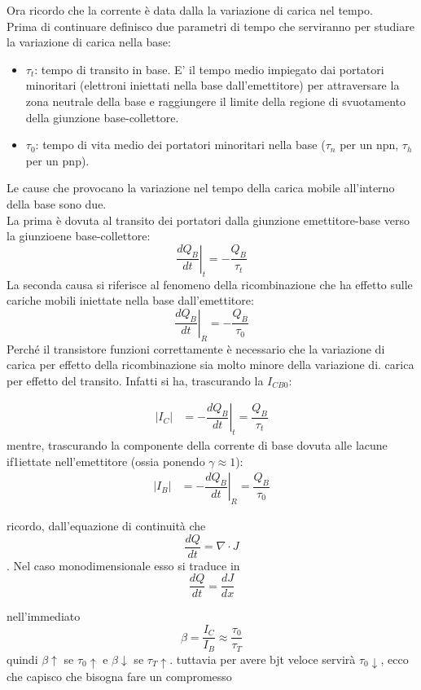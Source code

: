 Ora ricordo che la corrente è data dalla la variazione di carica nel tempo.\\
Prima di continuare  definisco due parametri di tempo che serviranno per studiare la variazione di carica nella base:
\begin{itemize}
    \item $\tau_t$: tempo di transito in base. E' il tempo medio impiegato dai portatori minoritari (elettroni iniettati nella base dall'emettitore) per attraversare la zona neutrale della base e raggiungere il limite della regione di svuotamento della giunzione base-collettore. 
    \item $\tau_0$: tempo di vita medio dei portatori minoritari nella base ($\tau_n$ per un npn, $\tau_h$ per un pnp). 
\end{itemize}
%
Le cause che provocano la variazione nel tempo della carica mobile all'interno della base sono due.\\
La prima è dovuta al transito dei portatori dalla giunzione emettitore-base verso la giunzioene base-collettore:
\begin{equation}
    \left.\dfrac{dQ_B}{dt}\right|_t= -\dfrac{Q_B}{\tau_t}
\end{equation}
La seconda causa si riferisce al fenomeno della ricombinazione che ha effetto sulle cariche mobili iniettate nella base dall'emettitore:
\begin{equation}
    \left.\dfrac{dQ_B}{dt}\right|_R= -\dfrac{Q_B}{\tau_0}
\end{equation}
Perché il transistore funzioni correttamente è necessario che la variazione di carica per effetto della ricombinazione sia molto minore della variazione di. carica per effetto del transito. Infatti si ha, trascurando la $I_{CB0}$: 

\begin{align}
    |I_C|&= -\left.\dfrac{dQ_B}{dt}\right|_t= \dfrac{Q_B}{\tau_t}
    \end{align}
    mentre, trascurando la componente della corrente di base dovuta alle lacune if1iettate nell'emettitore (ossia ponendo $\gamma \approx 1$): 
\begin{align}
    |I_B|&= -\left.\dfrac{dQ_B}{dt}\right|_R= \dfrac{Q_B}{\tau_0}
\end{align}

\begin{psbox}
    ricordo, dall'equazione di continuità che \[ \dfrac{dQ}{dt}= \nabla \cdot J\]. Nel caso monodimensionale esso si traduce in \[\dfrac{dQ}{dt}=\dfrac{dJ}{dx}\]
\end{psbox}
nell'immediato 
\begin{equation}
    \beta=\dfrac{I_C}{I_B} \approx \dfrac{\tau_0}{\tau_T}
\end{equation}
quindi $\beta \uparrow$ se $\tau_0 \uparrow$ e $\beta \downarrow$ se $\tau_T \uparrow$. tuttavia per avere bjt veloce servirà $\tau_0 \downarrow$, ecco che capisco che bisogna fare un compromesso


